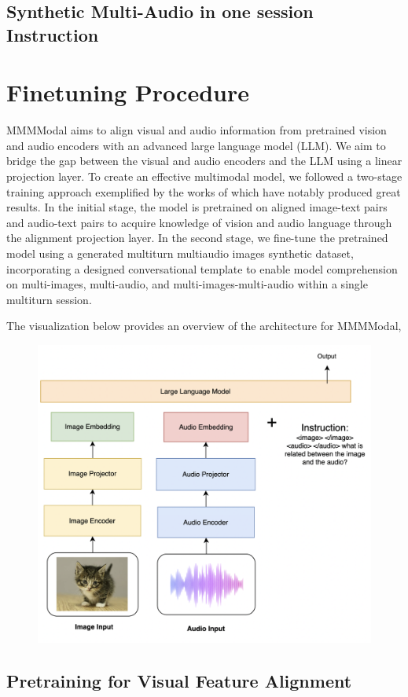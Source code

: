 \documentclass[preprint]{article}
\begin{document}
\subsection{Synthetic Multi-Audio in one session Instruction}

\section{Finetuning Procedure}

MMMModal aims to align visual and audio information from pretrained vision and audio encoders with an advanced large language model (LLM). We aim to bridge the gap between the visual and audio encoders and the LLM using a linear projection layer. To create an effective multimodal model, we followed a two-stage training approach exemplified by the works of \cite{han2023chartllama,zhu2023minigpt4,liu2024hidden} which have notably produced great results. In the initial stage, the model is pretrained on aligned image-text pairs and audio-text pairs to acquire knowledge of vision and audio language through the alignment projection layer. In the second stage, we fine-tune the pretrained model using a generated multiturn multiaudio images synthetic dataset, incorporating a designed conversational template to enable model comprehension on multi-images, multi-audio, and multi-images-multi-audio within a single multiturn session.

The visualization below provides an overview of the architecture for MMMModal,

\begin{figure}[hbt!]
  \centering
  \includegraphics[width=0.6\linewidth]{pic/overall-architecture.png} %
\end{figure}

\subsection{Pretraining for Visual Feature Alignment}
\end{document}
